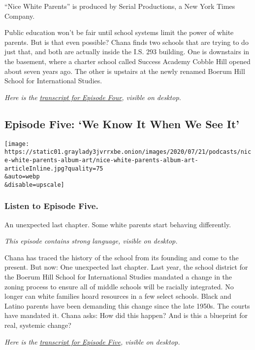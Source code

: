 ``Nice White Parents'' is produced by Serial Productions, a New York
Times Company.

Public education won't be fair until school systems limit the power of
white parents. But is that even possible? Chana finds two schools that
are trying to do just that, and both are actually inside the I.S. 293
building. One is downstairs in the basement, where a charter school
called Success Academy Cobble Hill opened about seven years ago. The
other is upstairs at the newly renamed Boerum Hill School for
International Studies.

\emph{Here is the}
\href{https://www.nytimes3xbfgragh.onion/2020/08/13/podcasts/nice-white-parents-school.html?showTranscript=}{\emph{transcript
for Episode Four}}\emph{, visible on desktop.}

\hypertarget{episode-five-we-know-it-when-we-see-it}{%
\subsection{Episode Five: `We Know It When We See
It'}\label{episode-five-we-know-it-when-we-see-it}}

\texttt{[image: https://static01.graylady3jvrrxbe.onion/images/2020/07/21/podcasts/nice-white-parents-album-art/nice-white-parents-album-art-articleInline.jpg?quality=75\\\&auto=webp\\\&disable=upscale]}

\hypertarget{listen-to-episode-five}{%
\subsubsection{Listen to Episode Five.}\label{listen-to-episode-five}}

An unexpected last chapter. Some white parents start behaving
differently.

\emph{This episode contains strong language, visible on desktop.}

Chana has traced the history of the school from its founding and come to
the present. But now: One unexpected last chapter. Last year, the school
district for the Boerum Hill School for International Studies mandated a
change in the zoning process to ensure all of middle schools will be
racially integrated. No longer can white families hoard resources in a
few select schools. Black and Latino parents have been demanding this
change since the late 1950s. The courts have mandated it. Chana asks:
How did this happen? And is this a blueprint for real, systemic change?

\emph{Here is the}
\href{https://www.nytimes3xbfgragh.onion/2020/08/20/podcasts/nice-white-parents-school.html?action=click\&module=audio-series-bar\&pgtype=Article\&region=header\&showTranscript=1}{\emph{transcript
for Episode Five}}\emph{, visible on desktop.}

